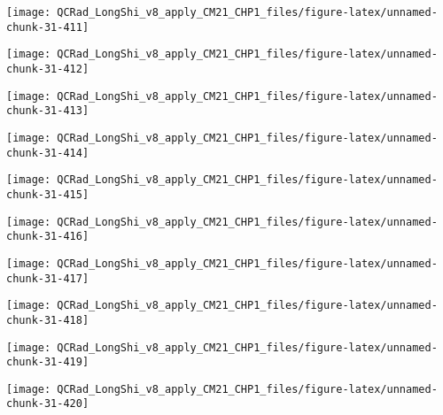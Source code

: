 \documentclass[
  10pt,
  a4paper,oneside]{article}
\begin{document}
\begin{center}\texttt{[image: QCRad\_LongShi\_v8\_apply\_CM21\_CHP1\_files/figure-latex/unnamed-chunk-31-411]} \end{center}

\begin{center}\texttt{[image: QCRad\_LongShi\_v8\_apply\_CM21\_CHP1\_files/figure-latex/unnamed-chunk-31-412]} \end{center}

\begin{center}\texttt{[image: QCRad\_LongShi\_v8\_apply\_CM21\_CHP1\_files/figure-latex/unnamed-chunk-31-413]} \end{center}

\begin{center}\texttt{[image: QCRad\_LongShi\_v8\_apply\_CM21\_CHP1\_files/figure-latex/unnamed-chunk-31-414]} \end{center}

\begin{center}\texttt{[image: QCRad\_LongShi\_v8\_apply\_CM21\_CHP1\_files/figure-latex/unnamed-chunk-31-415]} \end{center}

\begin{center}\texttt{[image: QCRad\_LongShi\_v8\_apply\_CM21\_CHP1\_files/figure-latex/unnamed-chunk-31-416]} \end{center}

\begin{center}\texttt{[image: QCRad\_LongShi\_v8\_apply\_CM21\_CHP1\_files/figure-latex/unnamed-chunk-31-417]} \end{center}

\begin{center}\texttt{[image: QCRad\_LongShi\_v8\_apply\_CM21\_CHP1\_files/figure-latex/unnamed-chunk-31-418]} \end{center}

\begin{center}\texttt{[image: QCRad\_LongShi\_v8\_apply\_CM21\_CHP1\_files/figure-latex/unnamed-chunk-31-419]} \end{center}

\begin{center}\texttt{[image: QCRad\_LongShi\_v8\_apply\_CM21\_CHP1\_files/figure-latex/unnamed-chunk-31-420]} \end{center}
\end{document}
